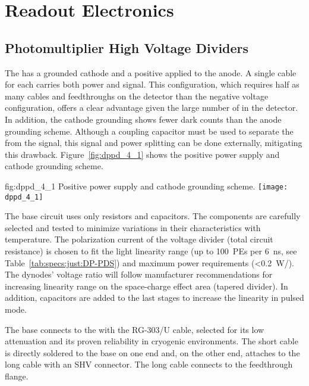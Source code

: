 \section{Readout Electronics}
\label{sec:dp-pds-electronics}

\subsection{Photomultiplier High Voltage Dividers}
\label{sec:fddp-pd-4.1}

The  has a grounded cathode and a positive  applied to the anode. A single cable for each  carries both power and signal. This configuration, which requires half as many cables and feedthroughs on the detector than the negative voltage configuration, offers a clear advantage given the large number of  in the detector. In addition, the cathode grounding shows fewer dark counts than the anode grounding scheme. Although a coupling capacitor must be used to separate the  from the  signal, this signal and power splitting can be done externally, mitigating this drawback.  Figure~\ref{fig:dppd_4_1} shows the positive power supply and cathode grounding scheme.

\begin{dunefigure}{fig:dppd_4_1}
{Positive power supply and cathode grounding scheme.}
\texttt{[image: dppd\_4\_1]}
\end{dunefigure}

The  base circuit uses only resistors and capacitors. The components are carefully selected and tested to minimize variations in their characteristics with temperature. The polarization current of the voltage divider (total circuit resistance) is chosen to fit the  light linearity range (up to \SI{100}{PEs} per \SI{6}{\ns}, see Table~\ref{tab:specs:just:DP-PDS}) and maximum power requirements (\SI{<0.2}{W/}). The dynodes' voltage ratio will follow manufacturer recommendations for increasing linearity range on the space-charge effect area (tapered divider). In addition, capacitors are added to the last stages  to increase the  linearity in pulsed mode.

The  base connects to the \fdth with the RG-303/U cable, selected for its low attenuation and its proven reliability in cryogenic environments. The short cable is directly soldered to the  base on one end and, on the other end, attaches to the long  cable with an SHV connector. The long cable connects to the feedthrough flange.

